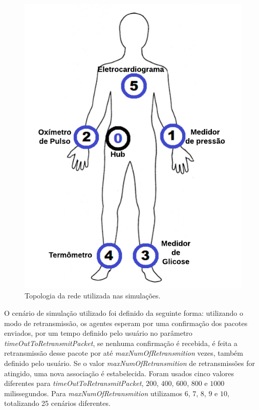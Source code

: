 
\begin{figure}[htbp]
\centering
\includegraphics[width=.3\textwidth]{figures/corpoSensoresNomes.png}
\caption{Topologia da rede utilizada nas simulações.}
\label{fig:wbantopology} 
\end{figure}

O cenário de simulação utilizado foi definido da seguinte forma: utilizando o modo de retransmissão, os agentes esperam por uma confirmação dos pacotes enviados, por um tempo definido pelo usuário no parâmetro \textit{timeOutToRetransmitPacket}, se nenhuma confirmação é recebida, é feita a retransmissão desse pacote por até \textit{maxNumOfRetransmition} vezes, também definido pelo usuário. Se o valor \textit{maxNumOfRetransmition} de retransmissões for atingido, uma nova associação é estabelecida. Foram usados cinco valores diferentes para \textit{timeOutToRetransmitPacket}, $200$, $400$, $600$, $800$ e $1000$ milissegundos. Para \textit{maxNumOfRetransmition} utilizamos $6$, $7$, $8$, $9$ e $10$, totalizando 25 cenários diferentes.

